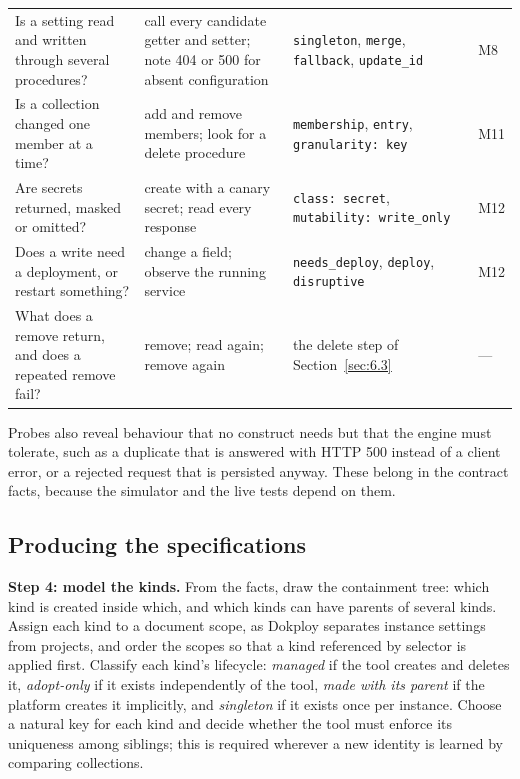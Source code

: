 \begin{table}[tbp]
\begin{tabularx}{\linewidth}{LLLl}
Is a setting read and written through several procedures? & call every candidate getter and setter; note 404 or 500 for absent configuration & \texttt{singleton}, \texttt{merge}, \texttt{fallback}, \texttt{update\_id} & M8 \\
Is a collection changed one member at a time? & add and remove members; look for a delete procedure & \texttt{membership}, \texttt{entry}, \texttt{granularity:\ key} & M11 \\
Are secrets returned, masked or omitted? & create with a canary secret; read every response & \texttt{class:\ secret}, \texttt{mutability:\ write\_only} & M12 \\
Does a write need a deployment, or restart something? & change a field; observe the running service & \texttt{needs\_deploy}, \texttt{deploy}, \texttt{disruptive} & M12 \\
What does a remove return, and does a repeated remove fail? & remove; read again; remove again & the delete step of Section~\ref{sec:6.3} & --- \\
\bottomrule
\end{tabularx}
\end{table}

Probes also reveal behaviour that no construct needs but that the engine must tolerate, such as a
duplicate that is answered with HTTP 500 instead of a client error, or a rejected request that is
persisted anyway. These belong in the contract facts, because the simulator and the live tests
depend on them.

\subsection{Producing the specifications}\label{sec:8.2}

\textbf{Step 4: model the kinds.} From the facts, draw the containment tree: which kind is created inside
which, and which kinds can have parents of several kinds. Assign each kind to a document scope, as
Dokploy separates instance settings from projects, and order the scopes so that a kind referenced by
selector is applied first. Classify each kind's lifecycle: \emph{managed} if the tool creates and deletes
it, \emph{adopt-only} if it exists independently of the tool, \emph{made with its parent} if the platform
creates it implicitly, and \emph{singleton} if it exists once per instance. Choose a natural key for each
kind and decide whether the tool must enforce its uniqueness among siblings; this is required
wherever a new identity is learned by comparing collections.

